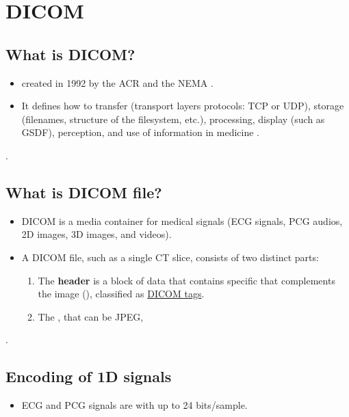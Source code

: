 \chapter{\gls{DICOM}}

\section{What is DICOM?}
\begin{itemize}
\item {}
   created in 1992 by
  the \gls{ACR} and the \gls{NEMA} \cite{DICOM2025}.
\item It defines how to transfer (transport layers protocols:
  \gls{TCP} or \gls{UDP}), storage (filenames, structure of the
  filesystem, etc.), processing, display (such as \gls{GSDF}),
  perception, and use of information in medicine
  \cite{bushberg2011essential}.
\end{itemize}.


\section{What is DICOM file?}
\begin{itemize}
\item \gls{DICOM} is a media container for medical signals
  (\gls{ECG} signals, \gls{PCG} audios, 2D images, 3D images, and videos).
\item A DICOM file, such as a single CT slice, consists of two
  distinct parts:
  \begin{enumerate}
  \item The \textbf{header} is a block of data that contains specific
      that complements the image
    (), classified as
    \href{https://dicom.nema.org/medical/dicom/current/output/html/part06.html#PS3.6}{DICOM
      tags}.
  \item The ,
    that can be \gls{JPEG},
  \end{enumerate}
\end{itemize}.

\section{Encoding of 1D signals}
\begin{itemize}
\item \gls{ECG} and \gls{PCG} signals are  with up to 24
  bits/sample.
\end{itemize}


